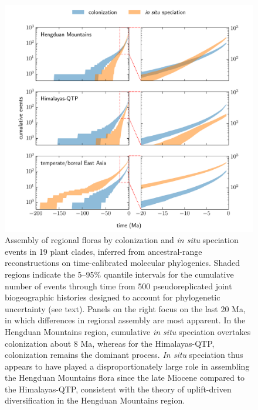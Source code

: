\documentclass[9pt,twocolumn,twoside,lineno]{pnas-new}
\begin{document}
\begin{figure}
\centering
\includegraphics[width=.99\linewidth]{cumulative_events.pdf}
\caption{Assembly of regional floras by colonization and \textit{in
    situ} speciation events in 19 plant clades, inferred from
  ancestral-range reconstructions on time-calibrated molecular
  phylogenies. Shaded regions indicate the 5--95\% quantile intervals
  for the cumulative number of events through time from 500
  pseudoreplicated joint biogeographic histories designed to account
  for phylogenetic uncertainty (see text). Panels on the right focus
  on the last 20 Ma, in which differences in regional assembly are
  most apparent. In the Hengduan Mountains region, cumulative
  \textit{in situ} speciation overtakes colonization about 8 Ma,
  whereas for the Himalayas-QTP, colonization remains the dominant
  process. \textit{In situ} speciation thus appears to have played a
  disproportionately large role in assembling the Hengduan Mountains
  flora since the late Miocene compared to the Himalayas-QTP,
  consistent with the theory of uplift-driven diversification in the
  Hengduan Mountains region.}
\label{fig:cumevents}
\end{figure}
\end{document}
